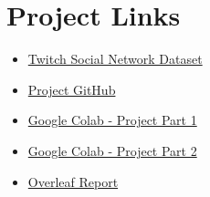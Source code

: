 \documentclass[10pt]{article}
\begin{document}
\section{Project Links}
\large
\begin{itemize}
    \item \href{https://snap.stanford.edu/data/twitch-social-networks.html}
    {Twitch Social Network Dataset}
    \item \href{https://github.com/jmwinemiller/cap-6315-project}
    {Project GitHub}
    \item \href{https://colab.research.google.com/drive/1PBR3qY-72iEfz-Xa9Fxx154dKrOsx_8-}
    {Google Colab - Project Part 1}
    \item \href{https://colab.research.google.com/drive/1qGJSBkJfJrQsiWbSuAR0w9ISzZR-hiyj}
    {Google Colab - Project Part 2}
    \item \href{https://www.overleaf.com/read/xrsbhmvfwvqc#2ab9ba}
    {Overleaf Report}
\end{itemize}
\end{document}
